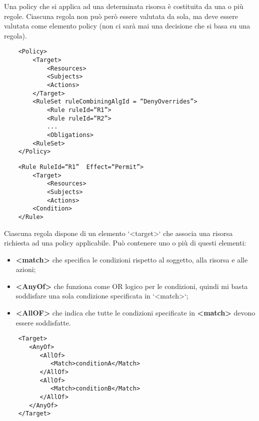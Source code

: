 \noindent Una policy che si applica ad una determinata risorsa è costituita da una o più regole. Ciascuna regola non può però essere valutata da sola, ma deve essere valutata come elemento policy (non ci sarà mai una decisione che si basa su una regola). 

\begin{lstlisting}
    <Policy>  
    	<Target>  
    		<Resources>  
    		<Subjects>  
    		<Actions>  
    	</Target>  
    	<RuleSet ruleCombiningAlgId = “DenyOverrides”>  
    		<Rule ruleId=“R1”>  
    		<Rule ruleId=“R2”>  
    		...  
    		<Obligations>  
    	<RuleSet>  
    </Policy>
\end{lstlisting}

\begin{lstlisting}
    <Rule RuleId=“R1”  Effect=“Permit”>  
    	<Target>  
    		<Resources>  
    		<Subjects>  
    		<Actions>  
    	<Condition>  
    </Rule> 
\end{lstlisting}

\noindent Ciascuna regola dispone di un elemento `<target>` che associa una risorsa richiesta ad una policy applicabile. Può contenere uno o più di questi elementi:
\begin{itemize}
    \item \textbf{<match>} che specifica le condizioni rispetto al soggetto, alla risorsa e alle azioni;
    \item \textbf{<AnyOf>} che funziona come OR logico per le condizioni, quindi mi basta soddisfare una sola condizione specificata in `<match>`;
    \item \textbf{<AllOF>} che indica che tutte le condizioni specificate in \textbf{<match>} devono essere soddisfatte.
\end{itemize}

\begin{lstlisting}
    <Target>  
       <AnyOf>  
          <AllOf>  
             <Match>conditionA</Match>  
          </AllOf>  
          <AllOf>  
             <Match>conditionB</Match>  
          </AllOf>  
       </AnyOf>  
    </Target>
\end{lstlisting}

